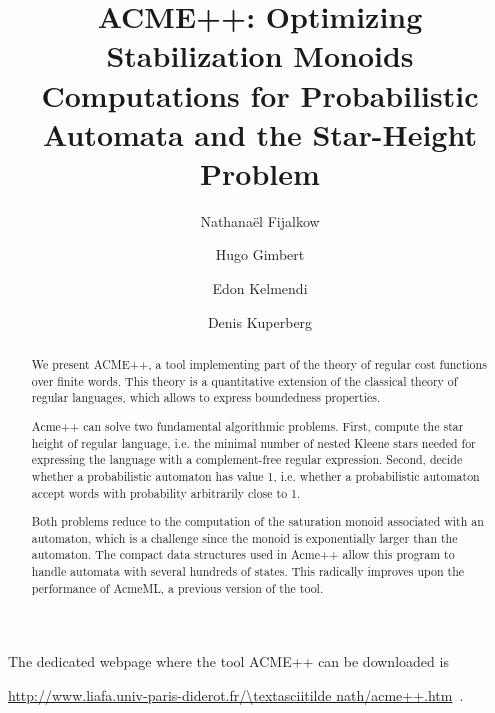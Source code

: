 \documentclass[11pt]{llncs}
\title{ACME++: Optimizing Stabilization Monoids Computations for Probabilistic Automata and the Star-Height Problem}
\author{Nathana\"el Fijalkow\inst{1,2} \and Hugo Gimbert\inst{3} \and Edon Kelmendi\inst{3} \and Denis Kuperberg\inst{4}}
\institute{LIAFA, Paris 7, France \and University of Warsaw, Poland \and LaBRI, Bordeaux, France \and Onera, Toulouse, France}
\begin{document}
\maketitle
\begin{abstract}
We present ACME++, 
a tool implementing part of the theory of regular cost functions
over finite words. 
This theory is a quantitative extension of the classical theory of regular languages,
which allows to express boundedness properties. 
%

Acme++ can solve two fundamental algorithmic problems.
First, compute the star height of regular language, 
i.e. the minimal number of nested Kleene stars needed for 
expressing the language with a complement-free regular expression.
Second, decide whether a probabilistic automaton has value 1,
i.e. whether a probabilistic automaton accept words with probability arbitrarily close to 1.

Both problems reduce to the computation of the saturation monoid associated with an automaton,
which is a challenge since the monoid is exponentially larger than the automaton.
The compact data structures used in Acme++ allow this program to handle automata with
several hundreds of states. This radically improves upon the performance of AcmeML,
a previous version of the tool.


\end{abstract}

The dedicated webpage where the tool ACME++ can be downloaded is
\begin{center}
\url{http://www.liafa.univ-paris-diderot.fr/\textasciitilde nath/acme++.htm}\ .
\end{center}














\end{document}
